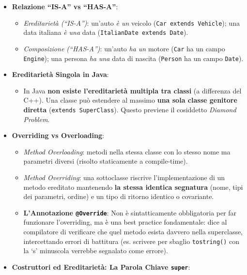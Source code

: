 \documentclass[11pt,a4paper,oneside]{report}
\newcommand{\passthrough}[1]{#1}
\providecommand{\tightlist}{\setlength{\itemsep}{0pt}\setlength{\parskip}{0pt}}
\begin{document}
\begin{itemize}
\tightlist
\item
  \textbf{Relazione ``IS-A'' vs ``HAS-A''}:

  \begin{itemize}
  \tightlist
  \item
    \emph{Ereditarietà (``IS-A'')}: un'auto \emph{è un} veicolo
    (\passthrough{\lstinline!Car extends Vehicle!}); una data italiana
    \emph{è una} data
    (\passthrough{\lstinline!ItalianDate extends Date!}).
  \item
    \emph{Composizione (``HAS-A'')}: un'auto \emph{ha un} motore
    (\passthrough{\lstinline!Car!} ha un campo
    \passthrough{\lstinline!Engine!}); una persona \emph{ha una} data di
    nascita (\passthrough{\lstinline!Person!} ha un campo
    \passthrough{\lstinline!Date!}).
  \end{itemize}
\item
  \textbf{Ereditarietà Singola in Java}:

  \begin{itemize}
  \tightlist
  \item
    In Java \textbf{non esiste l'ereditarietà multipla tra classi} (a
    differenza del C++). Una classe può estendere al massimo \textbf{una
    sola classe genitore diretta}
    (\passthrough{\lstinline!extends SuperClass!}). Questo previene il
    cosiddetto \emph{Diamond Problem}.
  \end{itemize}
\item
  \textbf{Overriding vs Overloading}:

  \begin{itemize}
  \tightlist
  \item
    \emph{Method Overloading}: metodi nella stessa classe con lo stesso
    nome ma parametri diversi (risolto staticamente a compile-time).
  \item
    \emph{Method Overriding}: una sottoclasse riscrive l'implementazione
    di un metodo ereditato mantenendo \textbf{la stessa identica
    segnatura} (nome, tipi dei parametri, ordine) e un tipo di ritorno
    identico o covariante.
  \item
    \textbf{L'Annotazione \passthrough{\lstinline!@Override!}}: Non è
    sintatticamente obbligatoria per far funzionare l'overriding, ma è
    una best practice fondamentale: dice al compilatore di verificare
    che quel metodo esista davvero nella superclasse, intercettando
    errori di battitura (es. scrivere per sbaglio
    \passthrough{\lstinline!tostring()!} con la `s' minuscola verrebbe
    segnalato come errore).
  \end{itemize}
\item
  \textbf{Costruttori ed Ereditarietà: La Parola Chiave
  \passthrough{\lstinline!super!}}:


\end{itemize}
\end{document}
